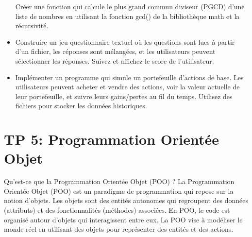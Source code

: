\documentclass[11pt]{article}
\begin{document}
\begin{itemize}
  Créer une fonction qui calcule le plus grand commun diviseur (PGCD)
  d'une liste de nombres en utilisant la fonction gcd() de la
  bibliothèque math et la récursivité.
\item
  Construire un jeu-questionnaire textuel où les questions sont lues à
  partir d'un fichier, les réponses sont mélangées, et les utilisateurs
  peuvent sélectionner les réponses. Suivez et affichez le score de
  l'utilisateur.
\item
  Implémenter un programme qui simule un portefeuille d'actions de base.
  Les utilisateurs peuvent acheter et vendre des actions, voir la valeur
  actuelle de leur portefeuille, et suivre leurs gains/pertes au fil du
  temps. Utilisez des fichiers pour stocker les données historiques.
\end{itemize}

    \hypertarget{tp-5-programmation-orientuxe9e-objet}{%
\section{TP 5: Programmation Orientée
Objet}\label{tp-5-programmation-orientuxe9e-objet}}

Qu'est-ce que la Programmation Orientée Objet (POO) ? La Programmation
Orientée Objet (POO) est un paradigme de programmation qui repose sur la
notion d'objets. Les objets sont des entités autonomes qui regroupent
des données (attributs) et des fonctionnalités (méthodes) associées. En
POO, le code est organisé autour d'objets qui interagissent entre eux.
La POO vise à modéliser le monde réel en utilisant des objets pour
représenter des entités et des actions.
\end{document}
